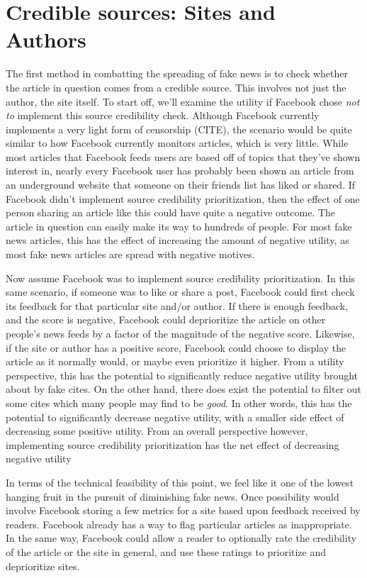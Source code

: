 \documentclass[12pt]{article}
\begin{document}
\section{Credible sources: Sites and Authors}
The first method in combatting the spreading of fake news is to check whether the article in question comes from a credible source. This involves not just the author, the site itself. To start off, we'll examine the utility if Facebook chose \textit{not to} implement this source credibility check. Although Facebook currently implements a very light form of censorship (CITE), the scenario would be quite similar to how Facebook currently monitors articles, which is very little. While most articles that Facebook feeds users are based off of topics that they've shown interest in, nearly every Facebook user has probably been shown an article from an underground website that someone on their friends list has liked or shared. If Facebook didn't implement source credibility prioritization, then the effect of one person sharing an article like this could have quite a negative outcome. The article in question can easily make its way to hundreds of people. For most fake news articles, this has the effect of increasing the amount of negative utility, as most fake news articles are spread with negative motives.

Now assume Facebook was to implement source credibility prioritization. In this same scenario, if someone was to like or share a post, Facebook could first check its feedback for that particular site and/or author. If there is enough feedback, and the score is negative, Facebook could deprioritize the article on other people's news feeds by a factor of the magnitude of the negative score. Likewise, if the site or author has a positive score, Facebook could choose to display the article as it normally would, or maybe even prioritize it higher. From a utility perspective, this has the potential to significantly reduce negative utility brought about by fake cites. On the other hand, there does exist the potential to filter out some cites which many people may find to be \textit{good}. In other words, this has the potential to significantly decrease negative utility, with a smaller side effect of decreasing some positive utility. From an overall perspective however, implementing source credibility prioritization has the net effect of decreasing negative utility

In terms of the technical feasibility of this point, we feel like it one of the lowest hanging fruit in the pursuit of diminishing fake news. Once possibility would involve Facebook storing a few metrics for a site based upon feedback received by readers. Facebook already has a way to flag particular articles as inappropriate. In the same way, Facebook could allow a reader to optionally rate the credibility of the article or the site in general, and use these ratings to prioritize and deprioritize sites. 
\end{document}
